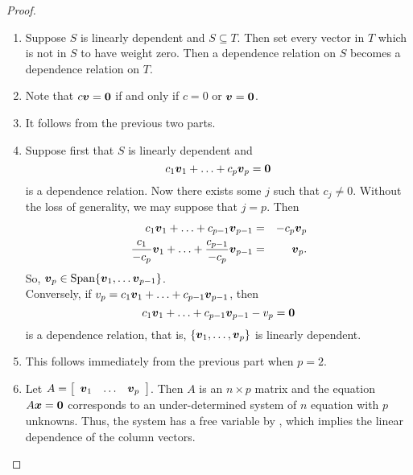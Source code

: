 \begin{proof}\mbox{}
\begin{enumerate}
\item Suppose $S$ is linearly dependent and $S\subseteq T$. Then set every vector in $T$ which is not in $S$ to have weight zero. Then a dependence relation on $S$ becomes a dependence relation on $T$.\\
\item Note that  $c\bb v = \bb 0$ if and only if $c = 0$ or $\bb v = \bb 0$.\\
\item It follows from the previous two parts. \\%
\item Suppose first that $S$ is linearly dependent and \[c_1\bb v_1 + \ldots + c_p\bb v_p = \bb 0\] is a dependence relation. Now there exists some $j$ such that $c_j\neq 0$. Without the loss of generality, we may suppose that $j=p$. Then 
\begin{eqnarray*}
c_1\bb v_1 + \ldots + c_{p-1}\bb v_{p-1} &=& -c_p\bb v_p\\
\frac{c_1}{-c_p}\bb v_1 + \ldots + \frac{c_{p-1}}{-c_p}\bb v_{p-1} &=& \bb v_p.
\end{eqnarray*} So, $\bb v_p \in \Span\{\bb v_1, \ldots \bb v_{p-1}\}$. \\

Conversely, if $v_p = c_1\bb v_1 + \ldots + c_{p-1}\bb v_{p-1}$, then \[c_1\bb v_1 + \ldots + c_{p-1}\bb v_{p-1} - v_p = \bb 0\] is a dependence relation, that is, $\{\bb v_1, \ldots, \bb v_p\}$ is linearly dependent.

\item This follows immediately from the previous part when $p=2$. \\ %

\item Let $A = \mtx{rrr}{\bb v_1 & \ldots & \bb v_p}$. Then $A$ is an $n\times p$ matrix and the equation $A\bb x = \bb 0$ corresponds to an under-determined system of $n$ equation with $p$ unknowns. Thus, the system has a free variable by , which implies the linear dependence of the column vectors. %
\hfill$\qedhere$
\end{enumerate}
\end{proof}\vs


